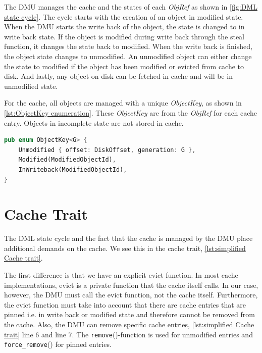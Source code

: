 \documentclass[
	12pt,
	a4paper,
	abstract,
	bibliography=totoc,
	chapterprefix,
	headings=openright,
	numbers=endperiod,
	parskip=half,
	twoside,
]{scrreprt}
\begin{document}
The DMU manages the cache and the states of each \emph{ObjRef} as shown in \ref{fig:DML state cycle}.
The cycle starts with the creation of an object in modified state. When the DMU starts the write back of the object, the state
is changed to in write back state.
If the object is modified during write back through the steal function, it changes the state back to modified.
When the write back is finished, the object state changes to unmodified.
An unmodified object can either change the state to modified if the object has been modified or evicted from cache to disk.
And lastly, any object on disk can be fetched in cache and will be in unmodified state.

For the cache, all objects are managed with a unique \emph{ObjectKey}, as shown in \cref{lst:ObjectKey enumeration}.
These \emph{ObjectKey} are  from the \emph{ObjRef} for each cache entry.
Objects in incomplete state are not stored in cache.

\bigskip

\begin{lstlisting}[language=Rust,mathescape=true,caption=ObjectKey enumeration,label=lst:ObjectKey enumeration]
pub enum ObjectKey<G> {
    Unmodified { offset: DiskOffset, generation: G },
    Modified(ModifiedObjectId),
    InWriteback(ModifiedObjectId),
}
\end{lstlisting}

\bigskip

\section{Cache Trait}
\label{sec:cache trait}

The DML state cycle and the fact that the cache is managed by the DMU place additional demands on the cache.
We see this in the cache trait, \cref{lst:simplified Cache trait}.

The first difference is that we have an explicit evict function. 
In most cache implementations, evict is a private function that the cache itself calls.
In our case, however, the DMU must call the evict function, not the cache itself.
Furthermore, the evict function must take into account that there are cache entries that 
are pinned i.e. in write back or modified state and therefore cannot be removed from the cache.
Also, the DMU can remove specific cache entries, \cref{lst:simplified Cache trait} line 6 and line 7.
The \texttt{remove}()-function is used for unmodified entries and \texttt{force\_remove}() for pinned entries.
\end{document}
